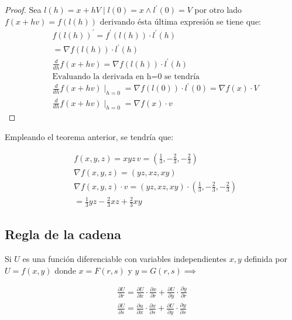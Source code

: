 \begin{proof}
	Sea $l(h)=x+hV\mid l(0)=x\land l^{\prime}(0)=V$ por otro lado $f(x+hv)=f\left(l(h)\right)$ derivando ésta última expresión se tiene que:
	\begin{align*}
		 & f\left(l(h)\right)^{\prime}=f^{\prime}\left(l(h)\right)\cdot l^{\prime}(h)                    \\
		 & =\nabla f\left(l(h)\right)\cdot l^{\prime}(h)                                                 \\
		 & \frac{d}{dh}f(x+hv)=\nabla f\left(l(h)\right)\cdot l^{\prime}(h)                              \\
		 & \text{Evaluando la derivada en h=0 se tendría}                                                \\
		 & \frac{d}{dh}f(x+hv)\mid_{h=0}=\nabla f\left(l(0)\right)\cdot l^{\prime}(0)=\nabla f(x)\cdot V \\
		 & \frac{d}{dh}f(x+hv)\mid_{h=0}=\nabla f(x)\cdot v
	\end{align*}
\end{proof}

Empleando el teorema anterior, se tendría que:

\begin{align*}
	 & f(x,y,z)=xyz\, v=\left(\frac{1}{3},-\frac{2}{3},-\frac{2}{3}\right)                       \\
	 & \nabla f(x,y,z)=(yz,xz,xy)                                                                \\
	 & \nabla f(x,y,z)\cdot v=(yz,xz,xy)\cdot \left(\frac{1}{3},-\frac{2}{3},-\frac{2}{3}\right) \\
	 & =\frac{1}{3}yz-\frac{2}{3}xz+\frac{2}{3}xy
\end{align*}

\subsection{Regla de la cadena}

Si $U$ es una función diferenciable con variables independientes $x,y$ definida por
$U=f(x,y)$ donde $x=F(r,s)$ y $y=G(r,s)\implies$

\begin{align*}
	\frac{\partial U}{\partial r}=\frac{\partial U}{\partial x}\cdot \frac{\partial x}{\partial r}+\frac{\partial U}{\partial y}\cdot \frac{\partial y}{\partial r} \\
	\frac{\partial U}{\partial s}=\frac{\partial u}{\partial x}\cdot \frac{\partial x}{\partial s}+\frac{\partial U}{\partial y}\cdot \frac{\partial y}{\partial s}
\end{align*}

